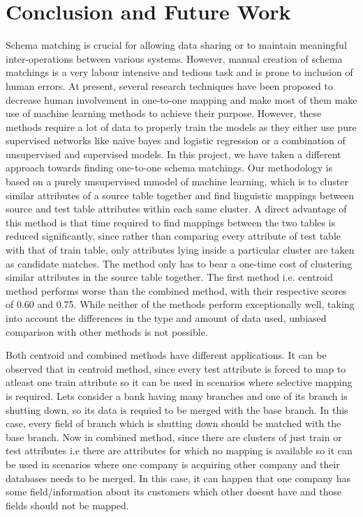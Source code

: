 \documentclass[conference]{IEEEtran}
\begin{document}
\section{Conclusion and Future Work}
Schema matching is crucial for allowing data sharing or to maintain meaningful inter-operations between various systems. However, manual creation of schema matchings is a very labour intensive and tedious task and is prone to inclusion of human errors. At present, several research techniques have been proposed to decrease human involvement in one-to-one mapping and make most of them make use of machine learning methods to achieve their purpose. However, these methods require a lot of data to properly train the models as they either use pure supervised networks like naive bayes and logistic regression or a combination of unsupervised and supervised models. In this project, we have taken a different approach towards finding one-to-one schema matchings. Our methodology is based on a purely unsupervised mmodel of machine learning, which is to cluster similar attributes of a source table together and find linguistic mappings between source and test table attributes within each same cluster. A direct advantage of this method is that time required to find mappings between the two tables is reduced significantly, since rather than comparing every attribute of test table with that of train table, only attributes lying inside a particular cluster are taken as candidate matches. The method only has to bear a one-time cost of clustering similar attributes in the source table together. The first method i.e. centroid method performs worse than the combined method, with their respective scores of 0.60 and 0.75. While neither of the methods perform exceptionally well, taking into account the differences in the type and amount of data used, unbiased comparison with other methods is not possible. 

Both centroid and combined methods have different applications. It can be observed that in centroid method, since every test attribute is forced to map to atleast one train attribute so it can be used in scenarios where selective mapping is required. Lets consider a bank having many branches and one of its branch is shutting down, so its data is requied to be merged with the base branch. In this case, every field of branch which is shutting down should be matched with the base branch.
Now in combined method, since there are clusters of just train or test attributes i.e there are attributes for which no mapping is available so it can be used in scenarios where one company is acquiring other company and their databases needs to be merged. In this case, it can happen that one company has some field/information about its customers which other doesnt have and those fields should not be mapped.
\end{document}
